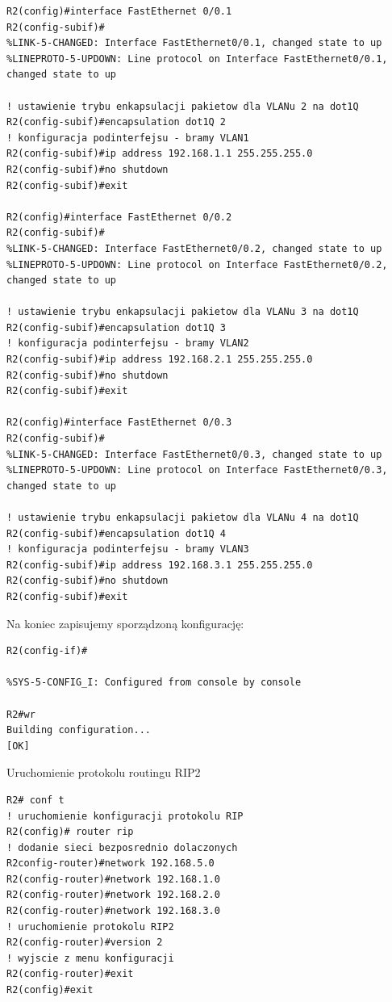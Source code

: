 \documentclass[polish,11pt,a4paper,twoside]{article}
\begin{document}
\begin{lstlisting}
R2(config)#interface FastEthernet 0/0.1
R2(config-subif)#
%LINK-5-CHANGED: Interface FastEthernet0/0.1, changed state to up
%LINEPROTO-5-UPDOWN: Line protocol on Interface FastEthernet0/0.1, changed state to up

! ustawienie trybu enkapsulacji pakietow dla VLANu 2 na dot1Q
R2(config-subif)#encapsulation dot1Q 2
! konfiguracja podinterfejsu - bramy VLAN1
R2(config-subif)#ip address 192.168.1.1 255.255.255.0
R2(config-subif)#no shutdown 
R2(config-subif)#exit

R2(config)#interface FastEthernet 0/0.2
R2(config-subif)#
%LINK-5-CHANGED: Interface FastEthernet0/0.2, changed state to up
%LINEPROTO-5-UPDOWN: Line protocol on Interface FastEthernet0/0.2, changed state to up

! ustawienie trybu enkapsulacji pakietow dla VLANu 3 na dot1Q
R2(config-subif)#encapsulation dot1Q 3
! konfiguracja podinterfejsu - bramy VLAN2
R2(config-subif)#ip address 192.168.2.1 255.255.255.0
R2(config-subif)#no shutdown 
R2(config-subif)#exit

R2(config)#interface FastEthernet 0/0.3
R2(config-subif)#
%LINK-5-CHANGED: Interface FastEthernet0/0.3, changed state to up
%LINEPROTO-5-UPDOWN: Line protocol on Interface FastEthernet0/0.3, changed state to up

! ustawienie trybu enkapsulacji pakietow dla VLANu 4 na dot1Q
R2(config-subif)#encapsulation dot1Q 4
! konfiguracja podinterfejsu - bramy VLAN3
R2(config-subif)#ip address 192.168.3.1 255.255.255.0
R2(config-subif)#no shutdown 
R2(config-subif)#exit
\end{lstlisting}
Na koniec zapisujemy sporządzoną konfigurację:
\begin{lstlisting}
R2(config-if)#

%SYS-5-CONFIG_I: Configured from console by console

R2#wr
Building configuration...
[OK]
\end{lstlisting}
Uruchomienie protokolu routingu RIP2 
\begin{lstlisting}
R2# conf t
! uruchomienie konfiguracji protokolu RIP
R2(config)# router rip
! dodanie sieci bezposrednio dolaczonych
R2config-router)#network 192.168.5.0
R2(config-router)#network 192.168.1.0
R2(config-router)#network 192.168.2.0
R2(config-router)#network 192.168.3.0
! uruchomienie protokolu RIP2
R2(config-router)#version 2
! wyjscie z menu konfiguracji
R2(config-router)#exit
R2(config)#exit
\end{lstlisting}
\end{document}
